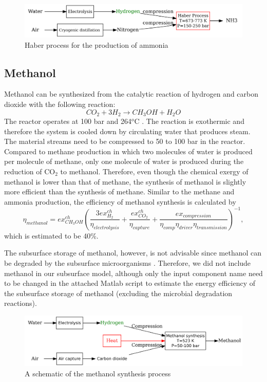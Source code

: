 \documentclass{ECOS_2021}
\begin{document}
\begin{figure}[H]
\centering
\includegraphics[width=12cm]{haber}

\caption{\label{fig:Haber-process}Haber process for the production of ammonia\cite{eftekhariQuantifyingRoleLiquid2020}}
\end{figure}

\sffamily \subsection{Methanol}
\normalsize
Methanol can be synthesized from the catalytic reaction of hydrogen
and carbon dioxide with the following reaction:
\begin{equation}
CO_{2}+3H_{2}\rightarrow CH_{3}OH+H_{2}O\label{eq:methanol}
\end{equation}
 The reactor operates at 100 bar and 264$^{o}$C \cite{luybenDesignControlMethanol2010}.
The reaction is exothermic and therefore the system is cooled down
by circulating water that produces steam. The material streams need
to be compressed to 50 to 100 bar in the reactor. Compared to methane
production in which two molecules of water is produced per molecule
of methane, only one molecule of water is produced during the reduction
of CO$_{2}$ to methanol. Therefore, even though the chemical exergy
of methanol is lower than that of methane, the synthesis of methanol
is slightly more efficient than the synthesis of methane. Similar
to the methane and ammonia production, the efficiency of methanol
synthesis is calculated by
\[
\eta_{methanol}=ex_{CH_{3}OH}^{ch}\left(\frac{3ex_{H_{2}}^{ch}}{\eta_{electrolysis}}+\frac{ex_{CO_{2}}^{ch}}{\eta_{capture}}+\frac{ex_{compression}}{\eta_{comp}\eta_{driver}\eta_{transmission}}\right)^{-1},
\]
which is estimated to be 40\%.

The subsurface storage of methanol, however, is not advisable since
methanol can be degraded by the subsurface microorganisms \cite{sousaDeepsubsurfaceSulfateReducer2018}.
Therefore, we did not include methanol in our subsurface model, although
only the input component name need to be changed in the attached Matlab
script to estimate the energy efficiency of the subsurface storage
of methanol (excluding the microbial degradation reactions). 

\begin{figure}[H]
\centering
\includegraphics[width=12cm]{methanol}

\caption{A schematic of the methanol synthesis process \cite{eftekhariQuantifyingRoleLiquid2020}}
\end{figure}
\end{document}
